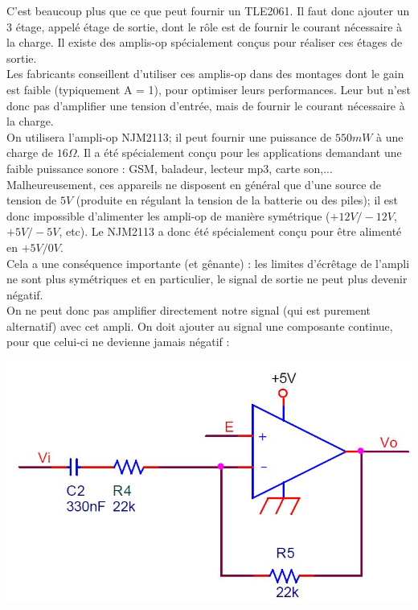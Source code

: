 C'est beaucoup plus que ce que peut fournir un TLE2061. Il faut donc ajouter un 3 étage, appelé étage de sortie, dont le rôle est de fournir le courant nécessaire à la charge. Il existe des amplis-op spécialement conçus pour réaliser ces étages de sortie.\\
Les fabricants conseillent d'utiliser ces amplis-op dans des montages dont le gain est faible (typiquement A = 1), pour optimiser leurs performances. Leur but n'est donc pas d'amplifier une tension d'entrée, mais de fournir le courant nécessaire à la charge.\\

On utilisera l'ampli-op NJM2113; il peut fournir une puissance de $550mW$ à une charge de $16\Omega$. Il a été spécialement conçu pour les applications demandant une faible puissance sonore : GSM, baladeur, lecteur mp3, carte son,...\\
Malheureusement, ces appareils ne disposent en général que d'une source de tension de $5V$ (produite en régulant la tension de la batterie ou des piles); il est donc impossible d'alimenter les ampli-op de manière symétrique ($+12V/-12V$, $+5V/-5V$, etc). Le NJM2113 a donc été spécialement conçu pour être alimenté en
$+5V/0V$.\\
Cela a une conséquence importante (et gênante) : les limites d'écrêtage de l'ampli ne sont plus symétriques et en particulier, le signal de sortie ne peut plus devenir négatif.\\
On ne peut donc pas amplifier directement notre signal (qui est purement alternatif) avec cet ampli. On doit ajouter au signal une composante continue, pour que celui-ci ne devienne jamais négatif :
\begin{center}
\includegraphics[scale=0.4]{polarisation.JPG}
\label{polarisation}
\end{center}

